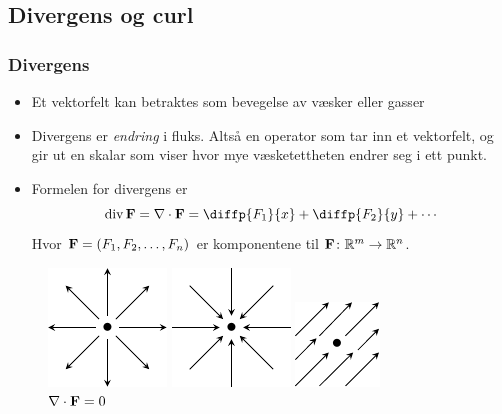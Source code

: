 \begin{frame}
  \section{Divergens og curl}
  \frametitle{Divergens}

\begin{itemize}
  \item Et vektorfelt kan betraktes som bevegelse av væsker eller gasser
  \item Divergens er \emph{endring} i fluks. Altså en operator som tar inn et vektorfelt, og gir ut en
    skalar som viser hvor mye væsketettheten endrer seg i ett punkt.
  \item Formelen for divergens er
    \begin{equation*}
      \div \F = \nabla \cdot \F
              = \diffp{{F_1}}{x} +
              \diffp{{F_2}}{y} +
              \cdots
    \end{equation*}
    Hvor $\mathbf{F} = (F_1, F_2, \ldots, F_n)$ er komponentene til $\mathbf{F} \colon \mathbb{R}^m \to \mathbb{R}^n$.
\end{itemize}

\begin{figure}
  \centering
  \begin{minipage}{.30\textwidth}
    \centering
  \includegraphics[scale=1.5]{../img/div-positive}
  \caption{$\nabla \cdot \F > 0 $}
\end{minipage}\hfill
\begin{minipage}{.30\textwidth}
    \centering
  \includegraphics[scale=1.5]{../img/div-negative}
  \caption{$\nabla \cdot \F <0 $}
\end{minipage}
\begin{minipage}{.30\textwidth}
    \centering
  \includegraphics[scale=1.5]{../img/div-null}
  \caption{$\nabla \cdot \mathbf{F} = 0$}
\end{minipage}
\end{figure}
\end{frame}

